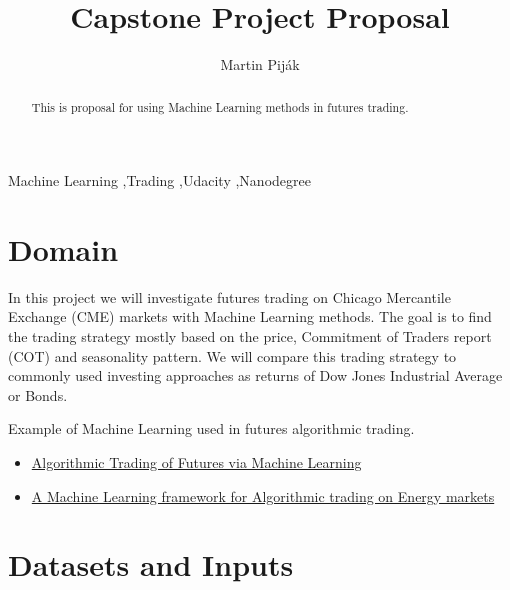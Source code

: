 \documentclass[final,2p]{elsarticle}
\begin{document}
\begin{frontmatter}

\title{Capstone Project Proposal}

\author{Martin Pij{\'a}k}

\address{Bratislava, Slovakia}

\begin{abstract}
This is proposal for using Machine Learning methods in futures trading.
\end{abstract}

\begin{keyword}
Machine Learning \sep{Trading} \sep{Udacity} \sep{Nanodegree}

\end{keyword}

\end{frontmatter}


\section{Domain}

In this project we will investigate futures trading on Chicago Mercantile Exchange (CME) markets with Machine Learning methods. The goal is to find the trading strategy mostly based on the price, Commitment of Traders report (COT) and seasonality pattern. We will compare this trading strategy to commonly used investing approaches as returns of Dow Jones Industrial Average or Bonds.

Example of Machine Learning used in futures algorithmic trading.
\begin{itemize}
    \item \href{http://cs229.stanford.edu/proj2014/David\%20Montague,\%20Algorithmic\%20Trading\%20of\%20Futures\%20via\%20Machine\%20Learning.pdf}{Algorithmic Trading of Futures via Machine Learning}
    \item \href{https://towardsdatascience.com/https-medium-com-skuttruf-machine-learning-in-finance-algorithmic-trading-on-energy-markets-cb68f747147}{A Machine Learning framework for Algorithmic trading on Energy markets}
\end{itemize}

\section{Datasets and Inputs}
\end{document}
